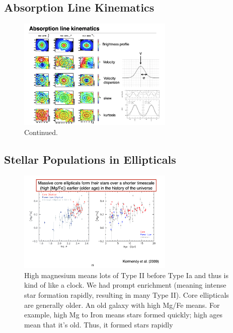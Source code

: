 \documentclass{article}
\begin{document}
\subsection{Absorption Line Kinematics}

\begin{figure}
    \centering
    \includegraphics[width=0.66\textwidth]{figs/Screen Shot 2021-10-20 at 10.28.35 AM.png}
    \caption{Continued.}
    \label{fig:continued_stuff}
\end{figure}

\subsection{Stellar Populations in Ellipticals}

\begin{figure}
    \centering
    \includegraphics[width=0.66\textwidth]{figs/Screen Shot 2021-10-20 at 10.35.28 AM.png}
    \caption{High magnesium means lots of Type II before Type Ia and thus is kind of like a clock. We had prompt enrichment (meaning intense star formation rapidly, resulting in many Type II). Core ellipticals are generally older. An old galaxy with high Mg/Fe means. For example, high Mg to Iron means stars formed quickly; high ages mean that it's old. Thus, it formed stars rapidly }
    \label{fig:stellar_pops_elliptical}
\end{figure}
\end{document}
